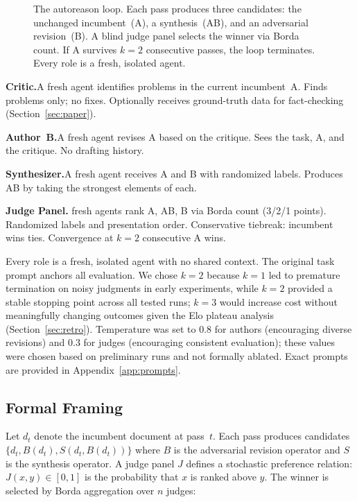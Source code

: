 \documentclass[10pt,twocolumn]{article}
\begin{document}
\begin{figure}[t]
\begin{tikzpicture}
\end{tikzpicture}
\caption{The autoreason loop. Each pass produces three candidates: the unchanged incumbent~(A), a synthesis~(AB), and an adversarial revision~(B). A blind judge panel selects the winner via Borda count. If A survives $k{=}2$ consecutive passes, the loop terminates. Every role is a fresh, isolated agent.}
\label{fig:method}
\end{figure}

\textbf{Critic.}\enspace A fresh agent identifies problems in the current incumbent~A. Finds problems only; no fixes. Optionally receives ground-truth data for fact-checking (Section~\ref{sec:paper}).

\textbf{Author~B.}\enspace A fresh agent revises A based on the critique. Sees the task, A, and the critique. No drafting history.

\textbf{Synthesizer.}\enspace A fresh agent receives A and B with randomized labels. Produces AB by taking the strongest elements of each.

\textbf{Judge Panel.} fresh agents rank A, AB, B via Borda count (3/2/1 points). Randomized labels and presentation order. Conservative tiebreak: incumbent wins ties. Convergence at $k{=}2$ consecutive A wins.

Every role is a fresh, isolated agent with no shared context. The original task prompt anchors all evaluation. We chose $k{=}2$ because $k{=}1$ led to premature termination on noisy judgments in early experiments, while $k{=}2$ provided a stable stopping point across all tested runs; $k{=}3$ would increase cost without meaningfully changing outcomes given the Elo plateau analysis (Section~\ref{sec:retro}). Temperature was set to 0.8 for authors (encouraging diverse revisions) and 0.3 for judges (encouraging consistent evaluation); these values were chosen based on preliminary runs and not formally ablated. Exact prompts are provided in Appendix~\ref{app:prompts}.

\subsection{Formal Framing}

Let $d_t$ denote the incumbent document at pass~$t$. Each pass produces candidates $\{d_t, B(d_t), S(d_t, B(d_t))\}$ where $B$ is the adversarial revision operator and $S$ is the synthesis operator. A judge panel $J$ defines a stochastic preference relation: $J(x, y) \in [0,1]$ is the probability that $x$ is ranked above $y$. The winner is selected by Borda aggregation over $n$ judges:
\end{document}
